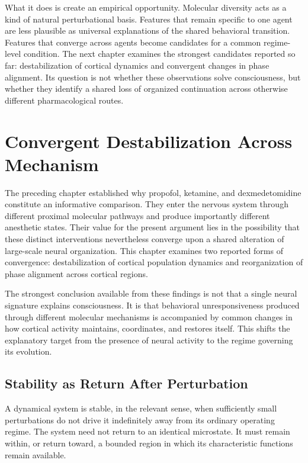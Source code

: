 \documentclass[11pt]{book}
\begin{document}
What it does is create an empirical opportunity. Molecular diversity acts as a kind of natural perturbational basis. Features that remain specific to one agent are less plausible as universal explanations of the shared behavioral transition. Features that converge across agents become candidates for a common regime-level condition. The next chapter examines the strongest candidates reported so far: destabilization of cortical dynamics and convergent changes in phase alignment. Its question is not whether these observations solve consciousness, but whether they identify a shared loss of organized continuation across otherwise different pharmacological routes.

\chapter{Convergent Destabilization Across Mechanism}

The preceding chapter established why propofol, ketamine, and dexmedetomidine constitute an informative comparison. They enter the nervous system through different proximal molecular pathways and produce importantly different anesthetic states. Their value for the present argument lies in the possibility that these distinct interventions nevertheless converge upon a shared alteration of large-scale neural organization. This chapter examines two reported forms of convergence: destabilization of cortical population dynamics and reorganization of phase alignment across cortical regions.

The strongest conclusion available from these findings is not that a single neural signature explains consciousness. It is that behavioral unresponsiveness produced through different molecular mechanisms is accompanied by common changes in how cortical activity maintains, coordinates, and restores itself. This shifts the explanatory target from the presence of neural activity to the regime governing its evolution.

\section*{Stability as Return After Perturbation}

A dynamical system is stable, in the relevant sense, when sufficiently small perturbations do not drive it indefinitely away from its ordinary operating regime. The system need not return to an identical microstate. It must remain within, or return toward, a bounded region in which its characteristic functions remain available.
\end{document}
